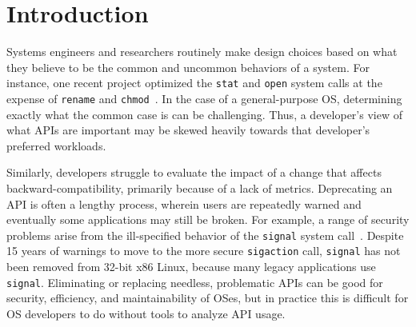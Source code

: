 \section{Introduction}
\label{sec:intro}


Systems engineers and researchers routinely make design choices based on 
what they believe to be the common and uncommon behaviors of a system.
For instance, one recent project optimized the {\tt stat} and {\tt open} system calls
at the expense of {\tt rename} and {\tt chmod}~\cite{tsai15dcache}.
In the case of a general-purpose OS, determining
exactly what the common case is can be challenging.
Thus, a developer's view of what APIs are important
may be skewed heavily towards that developer's preferred workloads.

Similarly, developers struggle to evaluate the impact of a 
change that affects backward-compatibility,
primarily because of a lack of metrics.
Deprecating an API is often a lengthy process, wherein
users are repeatedly warned 
and eventually some applications may still be broken.
For example, a range of security problems arise from the ill-specified behavior of the {\tt signal} system call~\cite{zalewski01signals,cert-signals}.
Despite 15 years of warnings to move to the more secure {\tt sigaction} call,
{\tt signal} has not been removed from 32-bit x86 Linux,
because many legacy applications use {\tt signal}.
Eliminating or replacing needless, problematic APIs 
can be good for security, efficiency, and maintainability of OSes,
but in practice this is difficult for OS developers to do without tools to analyze API usage.

